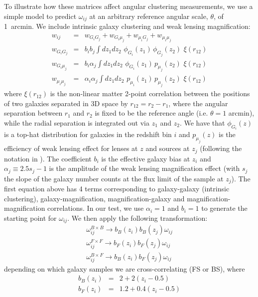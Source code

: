 To illustrate how these matrices affect angular clustering measurements, we use a simple model to
predict $\omega_{ij}$ at an arbitrary reference angular scale, $\theta$, of 1~arcmin. We include intrinsic
galaxy clustering and weak lensing magnification:
\begin{eqnarray}
\label{eq:all4}
w_{ij} &=& w_{G_iG_j}+ w_{G_i\mu_j} + w_{\mu_i  G_j}+ w_{\mu_i\mu_j} \\
w_{G_iG_j} &=&  b_ib_j \int dz_1dz_2  \, \, \phi_{G_i}(z_1) \, \phi_{G_j}(z_2)  \, \, \xi(r_{12}) \\
 w_{G_i\mu_j} & =&   b_i \alpha_j \int dz_1 dz_2 \, \,\phi_{G_i}(z_1) \, p_{\mu_j}(z_2) \, \, \xi(r_{12}) \\
w_{\mu_i\mu_j} & =&   \alpha_i \alpha_j \int dz_1 dz_2 \,  \, p_{\mu_i}(z_1) \, p_{\mu_j}(z_2) \, \, \xi(r_{12}) 
\end{eqnarray}
where $\xi(r_{12})$ is the non-linear matter 2-point correlation 
between the positions of two galaxies separated in 3D space by $r_{12}=r_2-r_1$, 
where the angular separation between $r_1$ and $r_2$ is fixed to be the reference angle (i.e. $\theta=1$ arcmin),
while the radial separation is integrated out via $z_1$ and $z_2$. We have that
$\phi_{G_i}(z)$ is a top-hat distribution for galaxies in the  redshift bin $i$  and $p_{\mu_j}(z)$ is the efficiency of weak
lensing effect for lenses at $z$ and sources at $z_j$ (following the notation in \citet{Gaztanaga2012}). 
The coefficient $b_i$ is the effective galaxy bias at $z_i$  and 
 $\alpha_j\equiv 2.5s_j-1$ is the amplitude of the weak lensing magnification effect (with $s_j$ the slope
of the galaxy number counts at the flux limit of the sample at $z_j$). 
The first equation above has 4 terms corresponding to galaxy-galaxy
(intrinsic clustering), galaxy-magnification, magnification-galaxy  and 
magnification-magnification correlations. In our test, we use $\alpha_i=1$ and $b_i=1$
to generate the starting point for $\omega_{ij}$. We then apply
the following transformation:
\begin{eqnarray}
\omega^{B\times B}_{ij} \rightarrow b_{B}(z_i)b_{B}(z_j)\omega_{ij} \\
\omega^{F\times F}_{ij} \rightarrow b_{F}(z_i)b_{F}(z_j)\omega_{ij} \\
\omega^{B\times F}_{ij} \rightarrow b_{B}(z_i)b_{F}(z_j)\omega_{ij}
\end{eqnarray}
depending on which galaxy samples we are cross-correlating (FS or BS), where
\begin{eqnarray}
b_{B}(z_i) &=& 2 + 2 (z_i - 0.5) \\
b_{F}(z_i) &=& 1.2 + 0.4 (z_i - 0.5)
\end{eqnarray}
